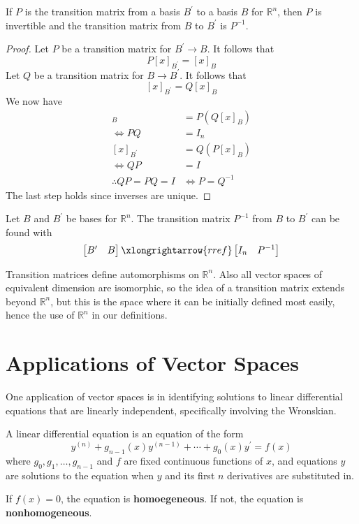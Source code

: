 \begin{theorem}
    If \(P\) is the transition matrix from a basis \(B^{\prime} \) to a basis \(B\) for \(\mathbb{R} ^n\), then \(P\) is invertible and the transition matrix from \(B\) to \(B^{\prime} \) is \(P ^{-1} \).
\end{theorem}
\begin{proof}
    Let \(P\) be a transition matrix for \(B^{\prime} \to B\). It follows that
    \[
        P[x]_{B^{\prime} }=[x]_B
    \]
    Let \(Q\) be a transition matrix for \(B\to B^{\prime} \). It follows that
    \[
        [x]_{B^{\prime} }=Q[x]_B
    \]
    We now have
    \begin{align*}
        [x]_B &=P\left( Q[x]_B \right)\\
        \iff PQ&=I_n\\
        [x]_{B^{\prime}} &=Q\left( P[x]_B \right)\\
        \iff QP&=I\\
        \therefore QP=PQ=I&\iff P=Q^{-1} 
    \end{align*}
    The last step holds since inverses are unique.
\end{proof}
\begin{theorem}
    Let \(B\) and \(B^{\prime} \) be bases for \(\mathbb{R}^n\). The transition matrix \(P ^{-1} \) from \(B\) to \(B^{\prime} \) can be found with
    \[
        \begin{bmatrix}
            B^{\prime}  &B   \\
        \end{bmatrix}\xlongrightarrow{rref} \begin{bmatrix}
            I_n &P ^{-1}    \\
        \end{bmatrix}
    \]
\end{theorem}
\begin{remark}
    Transition matrices define automorphisms on \(\mathbb{R}^n\). Also all vector spaces of equivalent dimension are isomorphic, so the idea of a transition matrix extends beyond \(\mathbb{R} ^n\), but this is the space where it can be initially defined most easily, hence the use of \(\mathbb{R}^n\) in our definitions.
\end{remark}
\section{Applications of Vector Spaces}
One application of vector spaces is in identifying solutions to linear differential equations that are linearly independent, specifically involving the Wronskian.
\begin{definition}
    A linear differential equation is an equation of the form 
    \[
        y^{(n)} + g_{n-1}(x)y^{(n-1)} + \cdots + g_0 (x)y^{\prime} =f(x)
    \]
    where \(g_0,g_1,\ldots,g_{n-1} \) and \(f\) are fixed continuous functions of \(x\), and equations \(y\) are solutions to the equation when \(y\) and its first \(n\) derivatives are substituted in.
\end{definition}
If \(f(x)=0\), the equation is \textbf{homoegeneous}. If not, the equation is \textbf{nonhomogeneous}.